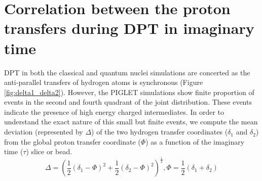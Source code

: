 \section{Correlation between the proton transfers during DPT in imaginary time}
\label{losss}

DPT in both the classical and quantum nuclei simulations are concerted as the anti-parallel transfers of hydrogen atoms is synchronous (Figure \ref{fig:delta1_delta2}). However, the PIGLET simulations show finite proportion of events in the second and fourth quadrant of the joint distribution. These events indicate the presence of high energy charged intermediates. In order to understand the exact nature of this small but finite events, we compute the mean deviation (represented by $\Delta$) of the two hydrogen transfer coordinates ($\delta_1$ and $\delta_2$) from the global proton transfer coordinate ($\Phi$) as a function of the imaginary time ($\tau$) slice or bead. 
\begin{equation}
    \Delta = (\frac{1}{2} (\delta_1-\Phi)^2 + \frac{1}{2} (\delta_2-\Phi)^2)^{\frac{1}{2}},{}{} \Phi = \frac{1}{2} (\delta_1 + \delta_2)
\end{equation}

